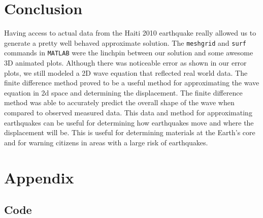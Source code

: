 \documentclass[conf]{new-aiaa}
\begin{document}
\section{Conclusion}
Having access to actual data from the Haiti 2010 earthquake really allowed us to generate a pretty well behaved approximate solution. The \lstinline{meshgrid} and \lstinline{surf} commands in \lstinline{MATLAB} were the linchpin between our solution and some awesome 3D animated plots. Although there was noticeable error as shown in our error plots, we still modeled a 2D wave equation that reflected real world data. The finite difference method proved to be a useful method for approximating the wave equation in 2d space and determining the displacement. The finite difference method was able to accurately predict the overall shape of the wave when compared to observed measured data. This data and method for approximating earthquakes can be useful for determining how earthquakes move and where the displacement will be. This is useful for determining materials at the Earth's core and for warning citizens in areas with a large risk of earthquakes. 

\newpage
\section*{Appendix}
\subsection{Code}


\newpage

\end{document}

